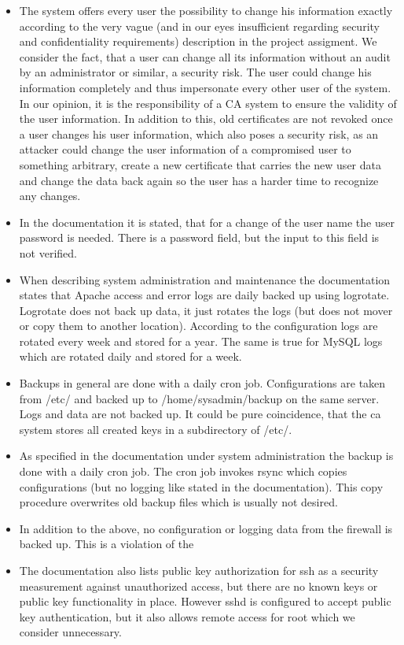 \documentclass{article}
\begin{document}
\begin{itemize}
\item The system offers every user the possibility to change his information exactly according to the very vague (and in our eyes insufficient regarding security and confidentiality requirements) description in the project assigment. We consider the fact, that a user can change all its information without an audit by an administrator or similar, a security risk. The user could change his information completely and thus impersonate every other user of the system. In our opinion, it is the responsibility of a CA system to ensure the validity of the user information. In addition to this, old certificates are not revoked once a user changes his user information, which also poses a security risk, as an attacker could change the user information of a compromised user to something arbitrary, create a new certificate that carries the new user data and change the data back again so the user has a harder time to recognize any changes.
\item In the documentation it is stated, that for a change of the user name the user password is needed. There is a password field, but the input to this field is not verified.
\item When describing system administration and maintenance the documentation states that Apache access and error logs are daily backed up using logrotate. Logrotate does not back up data, it just rotates the logs (but does not mover or copy them to another location). According to the configuration logs are rotated every week and stored for a year. The same is true for MySQL logs which are rotated daily and stored for a week.
\item Backups in general are done with a daily cron job. Configurations are taken from /etc/ and backed up to /home/sysadmin/backup on the same server. Logs and data are not backed up. It could be pure coincidence, that the ca system stores all created keys in a subdirectory of /etc/.
\item As specified in the documentation under system administration the backup is done with a daily cron job. The cron job invokes rsync which copies configurations (but no logging like stated in the documentation). This copy procedure overwrites old backup files which is usually not desired.
\item In addition to the above, no configuration or logging data from the firewall is backed up. This is a violation of the 
\item The documentation also lists public key authorization for ssh as a security measurement against unauthorized access, but there are no known keys or public key functionality in place. However sshd is configured to accept public key authentication, but it also allows remote access for root which we consider unnecessary.

\end{itemize}
\end{document}
